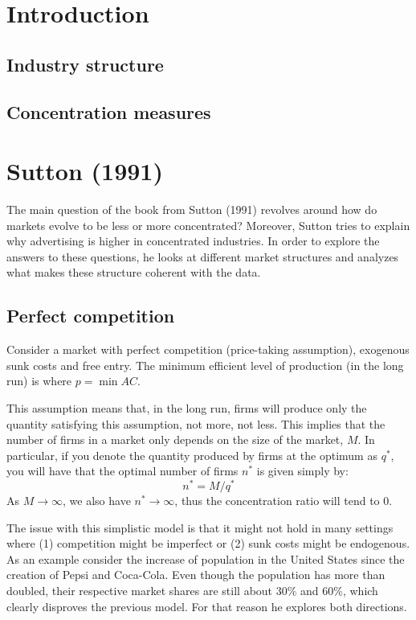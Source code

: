\section{Introduction}

\subsection{Industry structure}



\subsection{Concentration measures}



\section{Sutton (1991)}

The main question of the book from Sutton (1991) revolves around how do markets evolve to be less or more concentrated? Moreover, Sutton tries to explain why advertising is higher in concentrated industries. In order to explore the answers to these questions, he looks at different market structures and analyzes what makes these structure coherent with the data.

\subsection{Perfect competition}

Consider a market with perfect competition (price-taking assumption), exogenous sunk costs and free entry. The minimum efficient level of production (in the long run) is where $p = \min AC $. 

This assumption means that, in the long run, firms will produce only the quantity satisfying this assumption, not more, not less. This implies that the number of firms in a market only depends on the size of the market, $M$. In particular, if you denote the quantity produced by firms at the optimum as $q^*$, you will have that the optimal number of firms $n^*$ is given simply by: $$n^* = M/q^* $$
As $M\to\infty$, we also have $n^*\to\infty$, thus the concentration ratio will tend to 0.

The issue with this simplistic model is that it might not hold in many settings where (1) competition might be imperfect or (2) sunk costs might be endogenous. As an example consider the increase of population in the United States since the creation of Pepsi and Coca-Cola. Even though the population has more than doubled, their respective market shares are still about 30\% and 60\%, which clearly disproves the previous model. For that reason he explores both directions.

